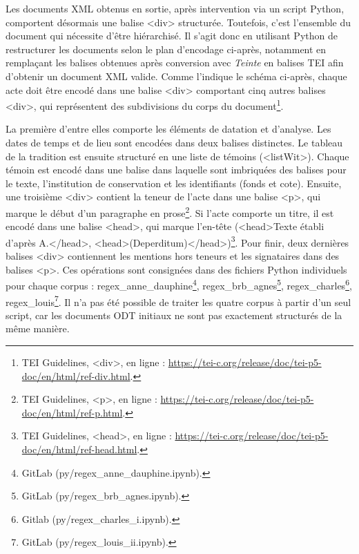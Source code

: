 \par Les documents XML obtenus en sortie, après intervention via un script Python, comportent désormais une balise <div> structurée. Toutefois, c'est l'ensemble du document qui nécessite d'être hiérarchisé. Il s'agit donc en utilisant Python de restructurer les documents selon le plan d'encodage ci-après, notamment en remplaçant les balises obtenues après conversion avec \textit{Teinte} en balises TEI afin d'obtenir un document XML valide. Comme l'indique le schéma ci-après, chaque acte doit être encodé dans une balise <div> comportant cinq autres balises <div>, qui représentent des subdivisions du corps du document\footnote{TEI Guidelines, <div>, en ligne : \url{https://tei-c.org/release/doc/tei-p5-doc/en/html/ref-div.html}.}. 
\newline 
\par La première d'entre elles comporte les éléments de datation et d'analyse. Les dates de temps et de lieu sont encodées dans deux balises distinctes. Le tableau de la tradition est ensuite structuré en une liste de témoins (<listWit>). Chaque témoin est encodé dans une balise dans laquelle sont imbriquées des balises pour le texte, l'institution de conservation et les identifiants (fonds et cote). Ensuite, une troisième <div> contient la teneur de l'acte dans une balise <p>, qui marque le début d'un paragraphe en prose\footnote{TEI Guidelines, <p>, en ligne : \url{https://tei-c.org/release/doc/tei-p5-doc/en/html/ref-p.html}.}. Si l'acte comporte un titre, il est encodé dans une balise <head>, qui marque l'en-tête (<head>Texte établi d'après A.</head>, <head>(Deperditum)</head>)\footnote{TEI Guidelines, <head>, en ligne : \url{https://tei-c.org/release/doc/tei-p5-doc/en/html/ref-head.html}.}. Pour finir, deux dernières balises <div> contiennent les mentions hors teneurs et les signataires dans des balises <p>. Ces opérations sont consignées dans des fichiers Python individuels pour chaque corpus : regex\_anne\_dauphine\footnote{GitLab (py/regex\_anne\_dauphine.ipynb).}, regex\_brb\_agnes\footnote{GitLab (py/regex\_brb\_agnes.ipynb).}, regex\_charles\footnote{Gitlab (py/regex\_charles\_i.ipynb).}, regex\_louis\footnote{GitLab (py/regex\_louis\_ii.ipynb).}. Il n'a pas été possible de traiter les quatre corpus à partir d'un seul script, car les documents ODT initiaux ne sont pas exactement structurés de la même manière. 

